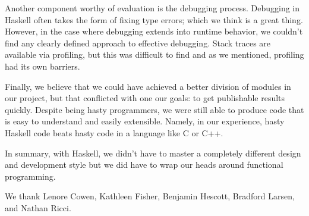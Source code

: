 \documentclass[preprint,nonatbib,blockstyle,nocopyrightspace,times]{sigplanconf}
\begin{document}
Another component worthy of evaluation is the debugging process.
Debugging in Haskell often takes the form of fixing type errors; which we think 
is a great thing.
However, in the case where debugging extends into runtime behavior, we couldn't 
find any clearly defined approach to effective debugging.
Stack traces are available via profiling, but this was difficult to find and 
as we mentioned, profiling had its own barriers.

Finally, we believe that we could have achieved a better division of modules in 
our project, but that conflicted with one our goals: to get publishable results
quickly. Despite being hasty programmers, we were still able to produce code 
that is easy to understand and easily extensible. Namely, in our experience, 
hasty Haskell code beats hasty code in a language like C or C++.

In summary, with Haskell, we didn't have to master a completely different 
design and development style but we did have to wrap our heads around 
functional programming.


%  
%  
%  

% 

\acks

We thank Lenore Cowen, Kathleen Fisher, Benjamin Hescott, Bradford Larsen, and Nathan Ricci.






\end{document}
